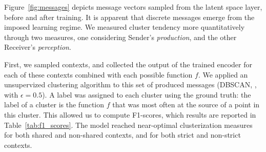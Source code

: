 \documentclass[11pt,a4paper]{article}
\newcommand{\nbEC}[1]{{\leavevmode\color{blue}{\scriptsize#1}}}
\begin{document}


Figure~\ref{fig:messages} depicts message vectors sampled from the latent space layer, before and after training. It is apparent that discrete messages emerge from the imposed learning regime. We measured cluster tendency more quantitatively through two measures, one considering Sender's \emph{production}, and the other Receiver's \emph{perception}. 

First, we sampled \nbEC{XXX} contexts, and collected the output of the trained encoder for each of these contexts combined with each possible function $f$. We applied an unsupervized clustering algorithm to this set of produced messages (DBSCAN, \citealp{ester_density-based_1996}, with $\epsilon = 0.5$). A label was assigned to each cluster using the ground truth: the label of a cluster is the function $f$ that was most often at the source of a point in this cluster. This allowed us to compute F1-scores, which results are reported in Table~\ref{tab:f1_scores}.
The model reached near-optimal clusterization measures for both shared and non-shared contexts, and for both strict and non-strict contexts. 
\end{document}
